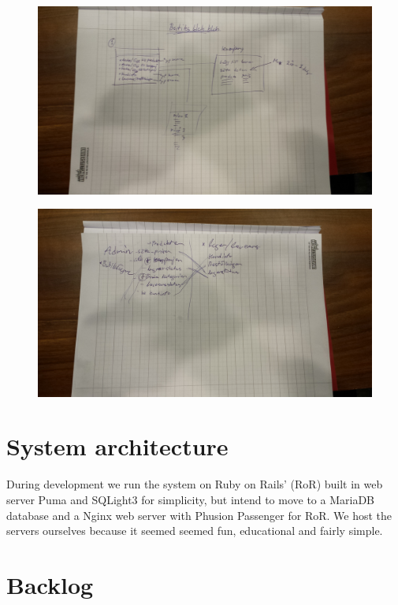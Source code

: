 \documentclass[paper=a4, fontsize=11pt]{report} %
\begin{document}
\begin{itemize}
	\begin{figure}
		\includegraphics[scale=0.12]{artifacts/ButiksAdmin.jpeg}
		\caption{}
		\label{fig:3}
	\end{figure}

	\begin{figure}
		\includegraphics[scale=0.12]{artifacts/Admin.jpeg}
		\caption{}
		\label{fig:4}
	\end{figure}

\section*{System architecture}
	During development we run the system on Ruby on Rails' (RoR) built in web server
	Puma and SQLight3 for simplicity, but intend to move to a MariaDB database
	and a Nginx web server with Phusion Passenger for RoR. We host
	the servers ourselves because it seemed seemed fun, educational and fairly simple.

\section*{Backlog}


\end{itemize}
\end{document}

